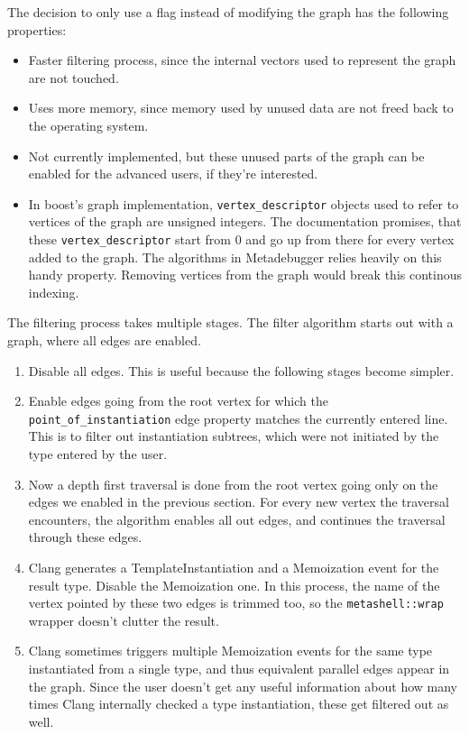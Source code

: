 The decision to only use a flag instead of modifying the graph has the
following properties:

\begin{itemize}
    \item
        Faster filtering process, since the internal vectors used to represent
        the graph are not touched.
    \item
        Uses more memory, since memory used by unused data are not freed back
        to the operating system.
    \item
        Not currently implemented, but these unused parts of the graph can be
        enabled for the advanced users, if they're interested.
    \item
        In boost's graph implementation, \texttt{vertex\_descriptor}
        objects used to refer to vertices of the graph are unsigned integers.
        The documentation promises, that these \texttt{vertex\_descriptor}
        start from 0 and go up from there for every vertex added to the graph.
        The algorithms in Metadebugger relies heavily on this handy property.
        Removing vertices from the graph would break this continous indexing.
\end{itemize}

The filtering process takes multiple stages. The filter algorithm starts out
with a graph, where all edges are enabled.

\begin{enumerate}
    \item
        Disable all edges. This is useful because the following stages become
        simpler.
    \item
        Enable edges going from the root vertex for which the
        \texttt{point\_of\_instantiation} edge property matches the currently
        entered line. This is to filter out instantiation subtrees, which were
        not initiated by the type entered by the user.
    \item
        Now a depth first traversal is done from the root vertex going only on
        the edges we enabled in the previous section. For every new vertex the
        traversal encounters, the algorithm enables all out edges, and
        continues the traversal through these edges.
    \item
        Clang generates a TemplateInstantiation and a Memoization event for the
        result type. Disable the Memoization one. In this process, the name of
        the vertex pointed by these two edges is trimmed too, so the
        \texttt{metashell::wrap} wrapper doesn't clutter the result.
    \item
        Clang sometimes triggers multiple Memoization events for the same type
        instantiated from a single type, and thus equivalent parallel edges
        appear in the graph. Since the user doesn't get any useful information
        about how many times Clang internally checked a type instantiation,
        these get filtered out as well.
\end{enumerate}

